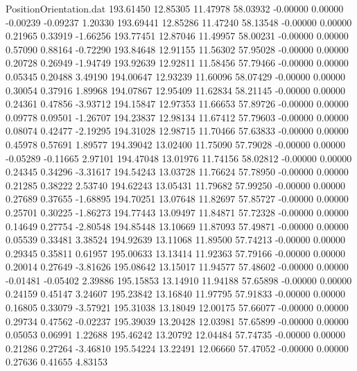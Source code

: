 \begin{filecontents}{PositionOrientation.dat}
 193.61450   12.85305   11.47978    58.03932   -0.00000    0.00000   -0.00239   -0.09237    1.20330
 193.69441   12.85286   11.47240    58.13548   -0.00000    0.00000    0.21965    0.33919   -1.66256
 193.77451   12.87046   11.49957    58.00231   -0.00000    0.00000    0.57090    0.88164   -0.72290
 193.84648   12.91155   11.56302    57.95028   -0.00000    0.00000    0.20728    0.26949   -1.94749
 193.92639   12.92811   11.58456    57.79466   -0.00000    0.00000    0.05345    0.20488    3.49190
 194.00647   12.93239   11.60096    58.07429   -0.00000    0.00000    0.30054    0.37916    1.89968
 194.07867   12.95409   11.62834    58.21145   -0.00000    0.00000    0.24361    0.47856   -3.93712
 194.15847   12.97353   11.66653    57.89726   -0.00000    0.00000    0.09778    0.09501   -1.26707
 194.23837   12.98134   11.67412    57.79603   -0.00000    0.00000    0.08074    0.42477   -2.19295
 194.31028   12.98715   11.70466    57.63833   -0.00000    0.00000    0.45978    0.57691    1.89577
 194.39042   13.02400   11.75090    57.79028   -0.00000    0.00000   -0.05289   -0.11665    2.97101
 194.47048   13.01976   11.74156    58.02812   -0.00000    0.00000    0.24345    0.34296   -3.31617
 194.54243   13.03728   11.76624    57.78950   -0.00000    0.00000    0.21285    0.38222    2.53740
 194.62243   13.05431   11.79682    57.99250   -0.00000    0.00000    0.27689    0.37655   -1.68895
 194.70251   13.07648   11.82697    57.85727   -0.00000    0.00000    0.25701    0.30225   -1.86273
 194.77443   13.09497   11.84871    57.72328   -0.00000    0.00000    0.14649    0.27754   -2.80548
 194.85448   13.10669   11.87093    57.49871   -0.00000    0.00000    0.05539    0.33481    3.38524
 194.92639   13.11068   11.89500    57.74213   -0.00000    0.00000    0.29345    0.35811    0.61957
 195.00633   13.13414   11.92363    57.79166   -0.00000    0.00000    0.20014    0.27649   -3.81626
 195.08642   13.15017   11.94577    57.48602   -0.00000    0.00000   -0.01481   -0.05402    2.39886
 195.15853   13.14910   11.94188    57.65898   -0.00000    0.00000    0.24159    0.45147    3.24607
 195.23842   13.16840   11.97795    57.91833   -0.00000    0.00000    0.16805    0.33079   -3.57921
 195.31038   13.18049   12.00175    57.66077   -0.00000    0.00000    0.29734    0.47562   -0.02237
 195.39039   13.20428   12.03981    57.65899   -0.00000    0.00000    0.05053    0.06991    1.22688
 195.46242   13.20792   12.04484    57.74735   -0.00000    0.00000    0.21286    0.27264   -3.46810
 195.54224   13.22491   12.06660    57.47052   -0.00000    0.00000    0.27636    0.41655    4.83153

\end{filecontents}
